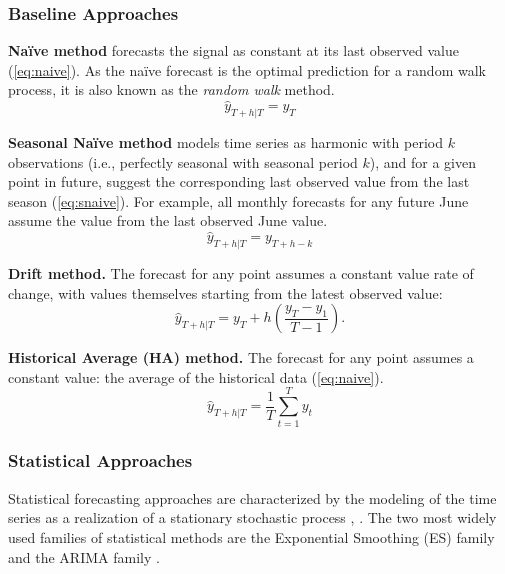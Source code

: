 \subsubsection{Baseline Approaches}\label{subsubsec:baseline_methods}

\noindent
\textbf{Naïve method} forecasts the signal as constant at its last observed value (\ref{eq:naive}).
As the naïve forecast is the optimal prediction for a random walk process, it is also known as the \textit{random walk} method.
\begin{equation}\label{eq:naive}
    \hat{y}_{T+h|T} = y_T
\end{equation}

\noindent
\textbf{Seasonal Naïve method} models time series as harmonic with period $k$ observations (i.e., perfectly seasonal with seasonal period $k$), and for a given point  in future, suggest the corresponding last observed value from the last season (\ref{eq:snaive}).
For example, all monthly forecasts for any future June assume the value from the last observed June value.
\begin{equation}\label{eq:snaive}
    \hat{y}_{T+h|T} = y_{T+h-k}
\end{equation}

\noindent
\textbf{Drift method.} The forecast for any point assumes a constant value rate of change, with values themselves starting from the latest observed value:
\begin{equation}\label{eq:drift}
    \hat{y}_{T+h|T} = y_{T} + h\left(\frac{y_T-y_1}{T-1} \right).
\end{equation}


\noindent
\textbf{Historical Average (HA) method.} The forecast for any point assumes a constant value: the average of the historical data (\ref{eq:naive}).
\begin{equation}\label{eq:ha}
\hat{y}_{T+h|T} = \frac{1}{T}\sum_{t=1}^Ty_t
\end{equation}

\subsubsection{Statistical Approaches}\label{subsubsec:statistical_methods}

Statistical forecasting approaches are characterized by the modeling of the time series as a realization of a stationary stochastic process \cite{brockwell1990methods}, \cite{bontempi2013strategies}.
The two most widely used families of statistical methods are the Exponential Smoothing (ES) family and the ARIMA family \cite{hyndman2018principles}.

